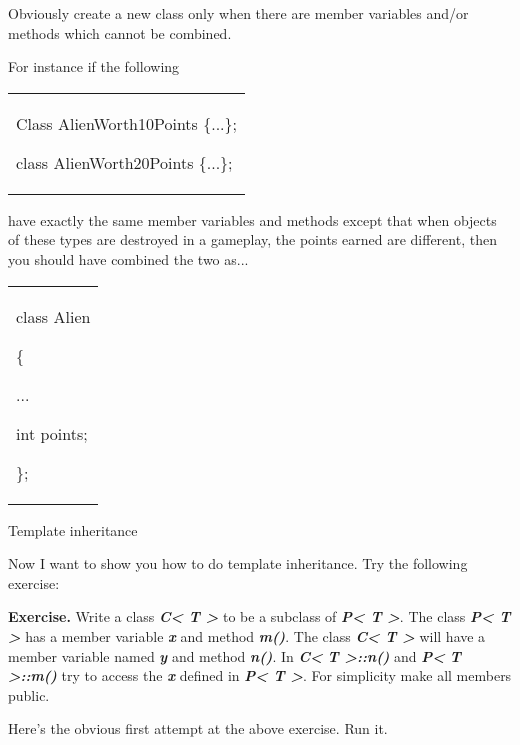 \documentclass[
]{article}
\begin{document}
Obviously create a new class only when there are member variables and/or
methods which cannot be combined.

For instance if the following

\begin{longtable}[]{@{}
  >{\raggedright\arraybackslash}p{}@{}}
\toprule\noalign{}
 \\
\midrule\noalign{}
\endhead
\bottomrule\noalign{}
\endlastfoot
Class AlienWorth10Points \{...\};

class AlienWorth20Points \{...\}; \\
\end{longtable}

have exactly the same member variables and methods except that when
objects of these types are destroyed in a gameplay, the points earned
are different, then you should have combined the two as...

\begin{longtable}[]{@{}
  >{\raggedright\arraybackslash}p{}@{}}
\toprule\noalign{}
 \\
\midrule\noalign{}
\endhead
\bottomrule\noalign{}
\endlastfoot
class Alien

\{

...

int points;

\}; \\
\end{longtable}

Template inheritance

Now I want to show you how to do template inheritance. Try the following
exercise:

\textbf{Exercise.} Write a class \emph{\textbf{C<{} T
\textgreater{}}} to be a subclass of \emph{\textbf{P<{} T
\textgreater{}}}. The class \emph{\textbf{P<{} T
\textgreater{}}} has a member variable \emph{\textbf{x}} and method
\emph{\textbf{m()}}. The class \emph{\textbf{C<{} T
\textgreater{}}}\textbf{ }will have a member variable named
\emph{\textbf{y}} and method \emph{\textbf{n()}}. In
\emph{\textbf{C<{} }\textbf{T \textgreater{}}\textbf{::n()}}
and\emph{\textbf{ P}\textbf{<{} }\textbf{T
\textgreater{}}\textbf{::}\textbf{m}\textbf{()}} try to access the
\emph{\textbf{x}} defined in \emph{\textbf{P<{} T
\textgreater{}}}. For simplicity make all members public.

Here's the obvious first attempt at the above exercise. Run it.
\end{document}
